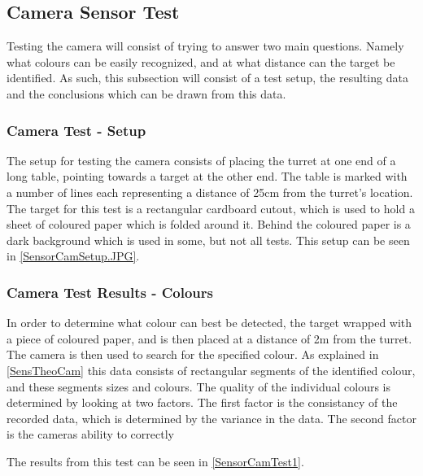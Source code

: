 \subsection{Camera Sensor Test}\label{CamTest}%
Testing the camera will consist of trying to answer two main questions. Namely
what colours can be easily recognized, and at what distance can the target be
identified. As such, this subsection will consist of a test setup, the resulting
data and the conclusions which can be drawn from this data.

\subsubsection{Camera Test - Setup}
The setup for testing the camera consists of placing the turret at one end of a
long table, pointing towards a target at the other end. The table is marked with
a number of lines each representing a distance of 25cm from the turret's
location. The target for this test is a rectangular cardboard cutout, which is
used to hold a sheet of coloured paper which is folded around it. Behind the
coloured paper is a dark background which is used in some, but not all tests.
This setup can be seen in \autoref{SensorCamSetup.JPG}.


\subsubsection{Camera Test Results - Colours}
In order to determine what colour can best be detected, the target wrapped with
a piece of coloured paper, and is then placed at a distance of 2m from the
turret. The camera is then used to search for the specified colour. As explained
in \autoref{SensTheoCam} this data consists of rectangular segments of the
identified colour, and these segments sizes and colours. The quality of the
individual colours is determined by looking at two factors. The first factor is
the consistancy of the recorded data, which is determined by the variance in the
data. The second factor is the cameras ability to correctly   


 The results from this test can be seen in
\autoref{SensorCamTest1}. 















